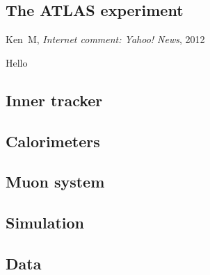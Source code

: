 \begin{singlespacing}
\chapter{The ATLAS experiment}
\label{chapter:experiment}
%
\begin{epigraphs}
%
{Ken~M,
\textit{Internet comment: Yahoo! News},
2012~\cite{kenm2012inner}}
\end{epigraphs}
\end{singlespacing}

Hello


\section{Inner tracker}

\section{Calorimeters}


\section{Muon system}

\section{Simulation}

\section{Data}
